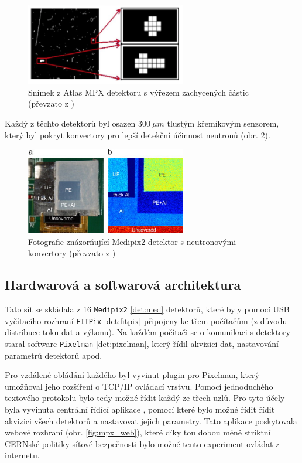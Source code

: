 \begin{figure}[ht]
	\begin{center}
		\includegraphics[width=7cm]{figures/mpx_cluster.png}
		\caption{Snímek z Atlas MPX detektoru s výřezem zachycených částic (převzato z \cite{atlasmpx})}
		\label{fig:mpx_cluster}
	\end{center}
\end{figure}


Každý z těchto detektorů byl osazen $300~\mu m$ tlustým křemíkovým senzorem, který byl pokryt konvertory pro lepší detekční účinnost neutronů (obr. \ref{fig:mpx_lay}).

\begin{figure}[ht]
	\begin{center}
		\includegraphics[width=7cm]{figures/mpx-layers.jpg}
		\caption{Fotografie znázorňující Medipix2 detektor s neutronovými konvertory (převzato z \cite{Vykydal200935})}
		\label{fig:mpx_lay}
	\end{center}
\end{figure}

\subsection{Hardwarová a softwarová architektura}
Tato síť se skládala z 16 \texttt{Medipix2} \ref{det:med} detektorů, které byly pomocí USB vyčítacího rozhraní \texttt{FITPix} \ref{det:fitpix} připojeny ke třem počítačům (z důvodu distribuce toku dat a výkonu). Na každém počítači se o komunikaci s detektory staral software \texttt{Pixelman} \ref{det:pixelman}, který řídil akvizici dat, nastavování parametrů detektorů apod. 

Pro vzdálené obládání každého byl vyvinut plugin pro Pixelman, který umožňoval jeho rozšíření o TCP/IP ovládací vrstvu. Pomocí jednoduchého textového protokolu bylo tedy možné řídit každý ze třech uzlů. Pro tyto účely byla vyvinuta centrální řídící aplikace \cite{Turecek2011S45}, pomocí které bylo možné řídit řídit akvizici všech detektorů a nastavovat jejich parametry. Tato aplikace poskytovala webové rozhraní (obr. \ref{fig:mpx_web}), které díky tou dobou méně striktní CERNské politiky síťové bezpečnosti bylo možné tento experiment ovládat z internetu.

